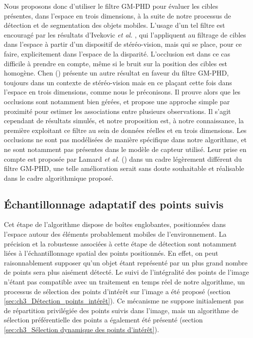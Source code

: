 Nous proposons donc d'utiliser le filtre GM-PHD pour évaluer les cibles présentes, dans l'espace en trois dimensions, à la suite de notre processus de détection et de segmentation des objets mobiles. L'usage d'un tel filtre est encouragé par les résultats d'Ivekovic \textit{et al.} \cite{Ivekovic2009}, qui l'appliquent au filtrage de cibles dans l'espace à partir d'un dispositif de stéréo-vision, mais qui se place, pour ce faire, explicitement dans l'espace de la disparité. L'occlusion est dans ce cas difficile à prendre en compte, même si le bruit sur la position des cibles est homogène. Chen (\cite{Chen2011}) présente un autre résultat en faveur du filtre GM-PHD, toujours dans un contexte de stéréo-vision mais en ce plaçant cette fois dans l'espace en trois dimensions, comme nous le préconisons. Il prouve alors que les occlusions sont notamment bien gérées, et propose une approche simple par proximité pour estimer les associations entre plusieurs observations. Il s'agit cependant de résultats simulés, et notre proposition est, à notre connaissance, la première exploitant ce filtre au sein de données réelles et en trois dimensions. Les occlusions ne sont pas modélisées de manière spécifique dans notre algorithme, et ne sont notamment pas présentes dans le modèle de capteur utilisé. Leur prise en compte est proposée par Lamard \textit{et al.} (\cite{Lamard2012}) dans un cadre légèrement différent du filtre GM-PHD, une telle amélioration serait sans doute souhaitable et réalisable dans le cadre algorithmique proposé.

\subsection{Échantillonnage adaptatif des points suivis}
Cet étape de l'algorithme dispose de boîtes englobantes, positionnées dans l'espace autour des éléments probablement mobiles de l'environnement. La précision et la robustesse associées à cette étape de détection sont notamment liées à l'échantillonnage spatial des points positionnés. En effet, on peut raisonnablement supposer qu'un objet étant représenté par un plus grand nombre de points sera plus aisément détecté. Le suivi de l'intégralité des points de l'image n'étant pas compatible avec un traitement en temps réel de notre algorithme, un processus de sélection des points d'intérêt sur l'image a été proposé (section \ref{sec:ch3_Détection_points_intérêt}). Ce mécanisme ne suppose initialement pas de répartition privilégiée des points suivis dans l'image, mais un algorithme de sélection préférentielle des points a également été présenté (section \ref{sec:ch3_Sélection dynamique des points d'intérêt}).\\

